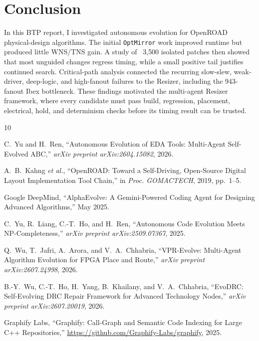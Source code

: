 \documentclass[10pt, conference]{IEEEtran}
\begin{document}
\section{Conclusion}
\label{sec:conclusion}

In this BTP report, I investigated autonomous evolution for OpenROAD physical-design algorithms. The initial \texttt{OptMirror} work improved runtime but produced little WNS/TNS gain. A study of ~3{,}500 isolated patches then showed that most unguided changes regress timing, while a small positive tail justifies continued search. Critical-path analysis connected the recurring slow-slew, weak-driver, deep-logic, and high-fanout failures to the  Resizer, including the 943-fanout Ibex bottleneck. These findings motivated the multi-agent Resizer framework, where every candidate must pass build, regression, placement, electrical, hold, and determinism checks before its timing result can be trusted.


\begin{thebibliography}{10}
\footnotesize
\setlength{\itemsep}{0.5pt plus 0.5pt}

C.~Yu and H.~Ren,
``Autonomous Evolution of EDA Tools: Multi-Agent Self-Evolved ABC,''
\textit{arXiv preprint arXiv:2604.15082}, 2026.

A.~B.~Kahng \textit{et al.},
``OpenROAD: Toward a Self-Driving, Open-Source Digital Layout Implementation Tool Chain,''
in \textit{Proc. GOMACTECH}, 2019, pp.~1--5.

Google DeepMind,
``AlphaEvolve: A Gemini-Powered Coding Agent for Designing Advanced Algorithms,'' May 2025.

C.~Yu, R.~Liang, C.-T.~Ho, and H.~Ren,
``Autonomous Code Evolution Meets NP-Completeness,''
\textit{arXiv preprint arXiv:2509.07367}, 2025.

Q.~Wu, T.~Jafri, A.~Arora, and V.~A.~Chhabria,
``VPR-Evolve: Multi-Agent Algorithm Evolution for FPGA Place and Route,''
\textit{arXiv preprint arXiv:2607.24998}, 2026.

B.-Y.~Wu, C.-T.~Ho, H.~Yang, B.~Khailany, and V.~A.~Chhabria,
``EvoDRC: Self-Evolving DRC Repair Framework for Advanced Technology Nodes,''
\textit{arXiv preprint arXiv:2607.20019}, 2026.

Graphify Labs,
``Graphify: Call-Graph and Semantic Code Indexing for Large C++ Repositories,''
\url{https://github.com/Graphify-Labs/graphify}, 2025.

\end{thebibliography}
\end{document}
